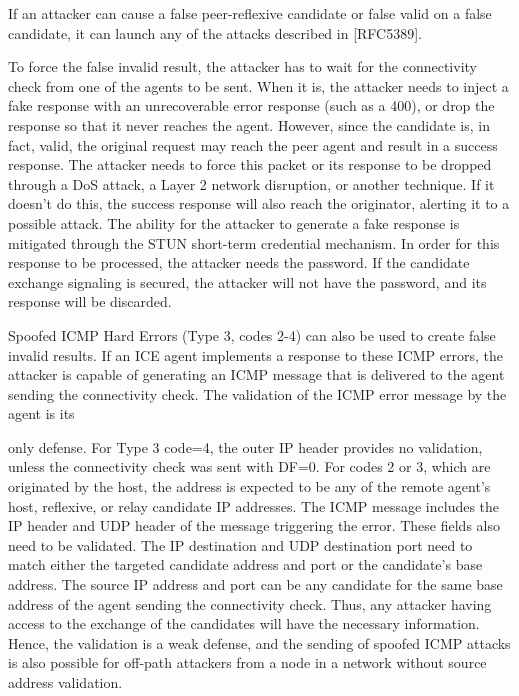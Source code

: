 \documentclass{article}
\begin{document}
If an attacker can cause a false peer-reflexive candidate or false valid on a false candidate, it can launch any of the attacks described in [RFC5389].

To force the false invalid result, the attacker has to wait for the connectivity check from one of the agents to be sent.  When it is, the attacker needs to inject a fake response with an unrecoverable error response (such as a 400), or drop the response so that it never reaches the agent.  However, since the candidate is, in fact, valid, the original request may reach the peer agent and result in a success response.  The attacker needs to force this packet or its response to be dropped through a DoS attack, a Layer 2 network disruption, or another technique.  If it doesn't do this, the success response will also reach the originator, alerting it to a possible attack.  The ability for the attacker to generate a fake response is mitigated through the STUN short-term credential mechanism.  In order for this response to be processed, the attacker needs the password.  If the candidate exchange signaling is secured, the attacker will not have the password, and its response will be discarded.

Spoofed ICMP Hard Errors (Type 3, codes 2-4) can also be used to create false invalid results.  If an ICE agent implements a response to these ICMP errors, the attacker is capable of generating an ICMP message that is delivered to the agent sending the connectivity check.  The validation of the ICMP error message by the agent is its

only defense.  For Type 3 code=4, the outer IP header provides no validation, unless the connectivity check was sent with DF=0.  For codes 2 or 3, which are originated by the host, the address is expected to be any of the remote agent's host, reflexive, or relay candidate IP addresses.  The ICMP message includes the IP header and UDP header of the message triggering the error.  These fields also need to be validated.  The IP destination and UDP destination port need to match either the targeted candidate address and port or the candidate's base address.  The source IP address and port can be any candidate for the same base address of the agent sending the connectivity check.  Thus, any attacker having access to the exchange of the candidates will have the necessary information.  Hence, the validation is a weak defense, and the sending of spoofed ICMP attacks is also possible for off-path attackers from a node in a network without source address validation.
\end{document}
